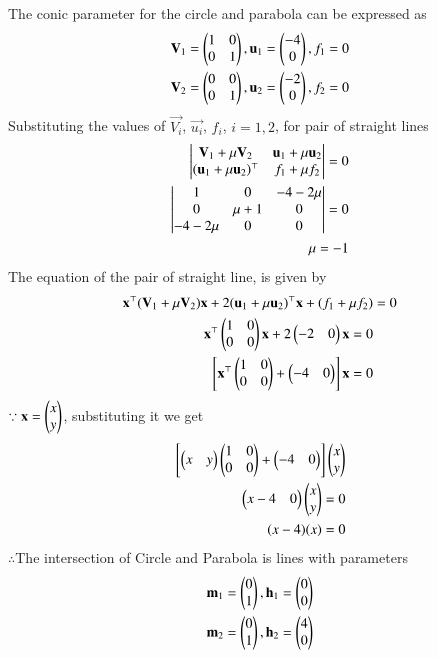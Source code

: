 \documentclass[journal]{IEEEtran}
\begin{document}
The conic parameter for the circle and parabola  can be expressed as 
\begin{align}
    \mathbf{V}_1 = \begin{pmatrix}1 & 0 \\ 0 & 1\end{pmatrix}, \mathbf{u}_1 = \begin{pmatrix}-4 \\ 0\end{pmatrix}, f_1 = 0 \\
    \mathbf{V}_2 = \begin{pmatrix}0 & 0 \\ 0 &1\end{pmatrix}, \mathbf{u}_2 = \begin{pmatrix}-2 \\ 0\end{pmatrix}, f_2 = 0
\end{align}
Substituting the values of $\vec{V_i}$, $\vec{u_i}$, $f_i$, $i = 1, 2$, for pair of straight lines\\
\begin{align}
 \begin{vmatrix}\mathbf{V}_1 + \mu\mathbf{V}_2 & \mathbf{u}_1 + \mu\mathbf{u}_2 \\ (\mathbf{u}_1+ \mu\mathbf{u}_2)^\top & f_1 + \mu f_2\end{vmatrix} = 0 \\
 \begin{vmatrix}1 & 0 & -4 -2\mu \\ 0 & \mu + 1 & 0 \\ -4-2\mu & 0 & 0\end{vmatrix} = 0   \\
 \mu = -1
\end{align}
The equation of the pair of straight line, is given by
\begin{align}
    \mathbf{x}^\top (\mathbf{V}_1+\mu\mathbf{V}_2)\mathbf{x}+2(\mathbf{u}_1 + \mu \mathbf{u}_2)^\top \mathbf{x} + (f_1 + \mu f_2) &= 0 \\
    \mathbf{x}^\top \begin{pmatrix}1 & 0 \\ 0 & 0\end{pmatrix}\mathbf{x}+2\begin{pmatrix}-2 & 0\end{pmatrix} \mathbf{x}   = 0  \\
    {}\left[\mathbf{x}^\top \begin{pmatrix}1 & 0 \\ 0 & 0\end{pmatrix} + \begin{pmatrix}-4 & 0\end{pmatrix}\right]\mathbf{x} = 0
\end{align}
$\because \mathbf{x} = \begin{pmatrix}x \\ y\end{pmatrix}$, substituting it we get
\begin{align}
    {}\left[\begin{pmatrix}x & y\end{pmatrix}\begin{pmatrix}1 & 0 \\ 0 & 0\end{pmatrix} + \begin{pmatrix}-4 & 0\end{pmatrix}\right]\begin{pmatrix}x \\ y\end{pmatrix} \\
    \begin{pmatrix}x-4 & 0\end{pmatrix}\begin{pmatrix}x \\ y \end{pmatrix} = 0 \\
    (x -4)(x) = 0
\end{align}
$\therefore $The intersection of Circle and Parabola is lines with parameters
\begin{align}
\mathbf{m}_1 = \begin{pmatrix}0 \\ 1\end{pmatrix}, \mathbf{h}_1 = \begin{pmatrix}0 \\ 0\end{pmatrix} \\
\mathbf{m}_2 = \begin{pmatrix}0 \\ 1\end{pmatrix}, \mathbf{h}_2 = \begin{pmatrix}4 \\ 0\end{pmatrix}
\end{align}
\end{document}
